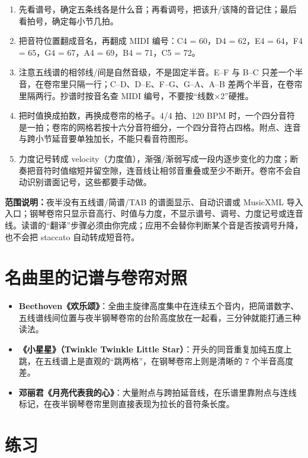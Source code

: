 \begin{enumerate}
  \item 先看谱号，确定五条线各是什么音；再看调号，把该升/该降的音记住；最后看拍号，确定每小节几拍。
  \item 把音符位置翻成音名，再翻成 MIDI 编号：C4 = 60，D4 = 62，E4 = 64，F4 = 65，G4 = 67，A4 = 69，B4 = 71，C5 = 72。
  \item 注意五线谱的相邻线/间是自然音级，不是固定半音。E--F 与 B--C 只差一个半音，在卷帘里只隔一行；C--D、D--E、F--G、G--A、A--B 差两个半音，在卷帘里隔两行。抄谱时按音名查 MIDI 编号，不要按“线数×2”硬推。
  \item 把时值换成拍数，再换成卷帘的格子。4/4 拍、120 BPM 时，一个四分音符是一拍；卷帘的网格若按十六分音符细分，一个四分音符占四格。附点、连音与跨小节延音要单独加长，不能只看音符图形。
  \item 力度记号转成 velocity（力度值），渐强/渐弱写成一段内逐步变化的力度；断奏把音符时值缩短并留空隙，连音线让相邻音重叠或至少不断开。卷帘不会自动识别谱面记号，这些都要手动做。
\end{enumerate}


\textbf{范围说明：}夜半没有五线谱/简谱/TAB 的谱面显示、自动识谱或 MusicXML 导入入口；钢琴卷帘只显示音高行、时值与力度，不显示谱号、调号、力度记号或连音线。读谱的“翻译”步骤必须由你完成；应用不会替你判断某个音是否按调号升降，也不会把 staccato 自动转成短音符。

\section{名曲里的记谱与卷帘对照}

\begin{itemize}
  \item \textbf{Beethoven《欢乐颂》}：全曲主旋律高度集中在连续五个音内，把简谱数字、五线谱线间位置与夜半钢琴卷帘的台阶高度放在一起看，三分钟就能打通三种读法。
  \item \textbf{《小星星》（Twinkle Twinkle Little Star）}：开头的同音重复加纯五度上跳，在五线谱上是直观的“跳两格”，在钢琴卷帘上则是清晰的 7 个半音高度差。
  \item \textbf{邓丽君《月亮代表我的心》}：大量附点与跨拍延音线，在乐谱里靠附点与连线标记，在夜半钢琴卷帘里则直接表现为拉长的音符条长度。
\end{itemize}

\section{练习}


